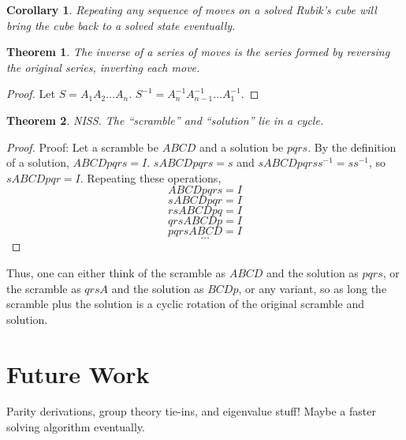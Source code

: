 \documentclass[11pt, oneside]{article}
\theoremstyle{plain}
\newtheorem{theorem}{Theorem}[section]
\newtheorem{corollary}{Corollary}[theorem]
\begin{document}
\begin{corollary}
Repeating any sequence of moves on a solved Rubik's cube
will bring the cube back to a solved state eventually.
\end{corollary}

\begin{theorem}
The inverse of a series of moves is the series formed
by reversing the original series, inverting each move.
\end{theorem}

\begin{proof}
Let \( S = A_1 A_2 \dots A_n \). \( S^{-1} =  A_n^{-1} A_{n - 1}^{-1} \dots A_1^{-1} \).
\end{proof}

\newpage

\begin{theorem}
NISS. The ``scramble'' and ``solution'' lie in a cycle.
\end{theorem}

\begin{proof}
Proof: Let a scramble be \( ABCD \) and a solution be \( pqrs \).
By the definition of a solution, \( ABCDpqrs = I \).
\( sABCDpqrs = s \) and \( sABCDpqrss^{-1} = ss^{-1} \), so
\( sABCDpqr = I \).
Repeating these operations,
\[ ABCDpqrs = I \]
\[ sABCDpqr = I \]
\[ rsABCDpq = I \]
\[ qrsABCDp = I \]
\[ pqrsABCD = I \]
\[ \dots \]
\end{proof}

Thus, one can either think of the scramble as \( ABCD \) and the solution as
\( pqrs \), or the scramble as \( qrsA \) and the solution as \( BCDp \), or
any variant, so as long the scramble plus the solution is a cyclic rotation
of the original scramble and solution.

\section{Future Work}

Parity derivations, group theory tie-ins, and eigenvalue stuff!
Maybe a faster solving algorithm eventually.
\end{document}
